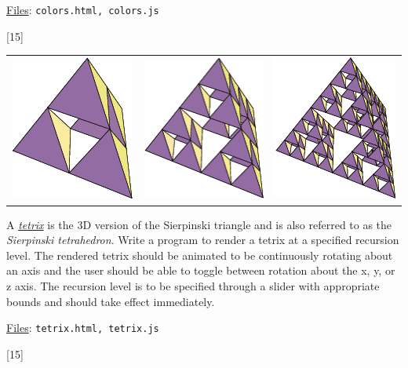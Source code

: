 \documentclass[addpoints]{exam}
\begin{document}
\begin{questions}
  \noindent\underline{Files}: {\tt colors.html, colors.js}

  [15]

  \begin{tabular}{ccc}
    \includegraphics[width=.3\textwidth]{tetrix1}
    & \includegraphics[width=.3\textwidth]{tetrix2}
    & \includegraphics[width=.3\textwidth]{tetrix3}
  \end{tabular}
  A \href{http://mathworld.wolfram.com/Tetrix.html}{\it tetrix} is the 3D version of the Sierpinski triangle and is also referred to as the \textit{Sierpinski tetrahedron}. Write a program to render a tetrix at a specified recursion level. The rendered tetrix should be animated to be continuously rotating about an axis and the user should be able to toggle between rotation about the x, y, or z axis. The recursion level is to be specified through a slider with appropriate bounds and should take effect immediately.

  \noindent\underline{Files}: {\tt tetrix.html, tetrix.js}

  [15]
  \label{q:galore}
  

\end{questions}
\end{document}
